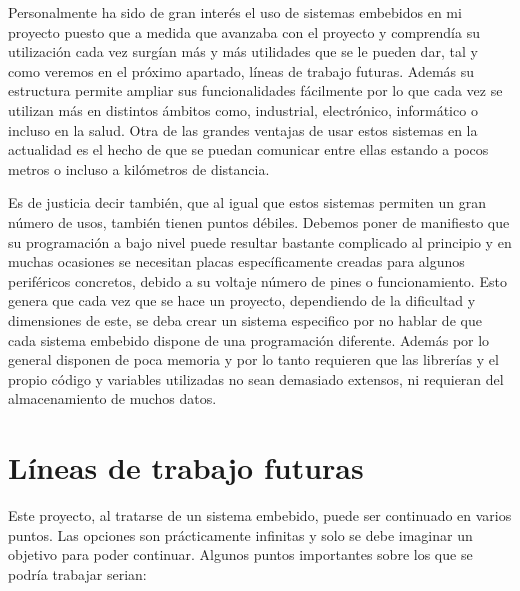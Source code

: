 Personalmente ha sido de gran interés el uso de sistemas embebidos en mi proyecto puesto que a medida que avanzaba con el proyecto y comprendía su utilización cada vez surgían más y más utilidades que se le pueden dar, tal y como veremos en el próximo apartado, líneas de trabajo futuras. Además su estructura permite ampliar sus funcionalidades fácilmente por lo que cada vez se utilizan más en distintos ámbitos como, industrial, electrónico, informático o incluso en la salud. Otra de las grandes ventajas de usar estos sistemas en la actualidad es el hecho de que se puedan comunicar entre ellas estando a pocos metros o incluso a kilómetros de distancia. 

Es de justicia decir también, que al igual que estos sistemas permiten un gran número de usos, también tienen puntos débiles. Debemos poner de manifiesto que su programación a bajo nivel puede resultar bastante complicado al principio y en muchas ocasiones se necesitan placas específicamente creadas para algunos periféricos concretos, debido a su voltaje número de pines o funcionamiento. Esto genera que cada vez que se hace un proyecto, dependiendo de la dificultad y dimensiones de este, se deba crear un sistema especifico por no hablar de que cada sistema embebido dispone de una programación diferente. Además por lo general disponen de poca memoria y por lo tanto requieren que las librerías y el propio código y variables utilizadas no sean demasiado extensos, ni requieran del almacenamiento de muchos datos.


\section{Líneas de trabajo futuras}\label{sec:LTF}

Este proyecto, al tratarse de un sistema embebido, puede ser continuado en varios puntos. Las opciones son prácticamente infinitas y solo se debe imaginar un objetivo para poder continuar. Algunos puntos importantes sobre los que se podría trabajar serian:

